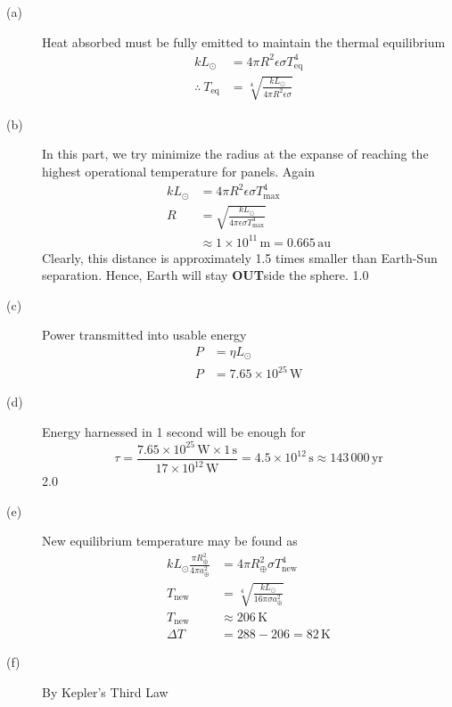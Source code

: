 \begin{description}
\item[(a)] Heat absorbed must be fully emitted to maintain the thermal
  equilibrium
  \begin{align*}
  kL_\odot &= 4\pi R^2\epsilon\sigma T_{\mathrm{eq}}^4
    \tag*{2.0}\\
  \therefore\ T_{\mathrm{eq}} &=
    \sqrt[4]{\frac{kL_\odot}{4\pi R^2\epsilon\sigma}}
    \tag*{1.0}
  \end{align*}
\item[(b)] In this part, we try minimize the radius at the expanse of
  reaching the highest operational temperature for panels. Again
  \begin{align*}
  kL_\odot &= 4\pi R^2\epsilon\sigma T_{\max}^4\\
  R &= \sqrt{\frac{kL_\odot}{4\pi\epsilon\sigma T_{\max}^4}}
    \tag*{1.0}\\
  &\approx 1\times10^{11}\,\mathrm{m} = 0.665\,\mathrm{au}
    \tag*{2.0}
  \end{align*}
  Clearly, this distance is approximately 1.5 times smaller than Earth-Sun
  separation. Hence, Earth will stay \textbf{OUT}side the sphere. \hfill 1.0
\item[(c)] Power transmitted into usable energy
  \begin{align*}
  P &= \eta L_\odot\\
  P &= 7.65\times10^{25}\,\mathrm{W}
    \tag*{2.0}
  \end{align*}
\item[(d)] Energy harnessed in 1 second will be enough for
  \[ \tau = \frac{7.65\times10^{25}\,\mathrm{W}\times1\,\mathrm{s}}
       {17\times10^{12}\,\mathrm{W}}
     = 4.5\times10^{12}\,\mathrm{s} \approx 143\,000\,\mathrm{yr} \]
  \hfill 2.0
\item[(e)] New equilibrium temperature may be found as
  \begin{align*}
  kL_\odot\frac{\pi R_\oplus^2}{4\pi a_\oplus^2}
    &= 4\pi R_\oplus^2\sigma T_{\mathrm{new}}^4
    \tag*{2.0}\\
  T_{\mathrm{new}} &= \sqrt[4]{\frac{kL_\odot}{16\pi\sigma a_\oplus^2}}\\
  T_{\mathrm{new}} &\approx 206\,\mathrm{K}
    \tag*{2.0}\\
  \Delta T &= 288 - 206 = 82\,\mathrm{K}
    \tag*{1.0}
  \end{align*}
\item[(f)] By Kepler's Third Law
  \begin{align*}

\end{align*}
\end{description}

